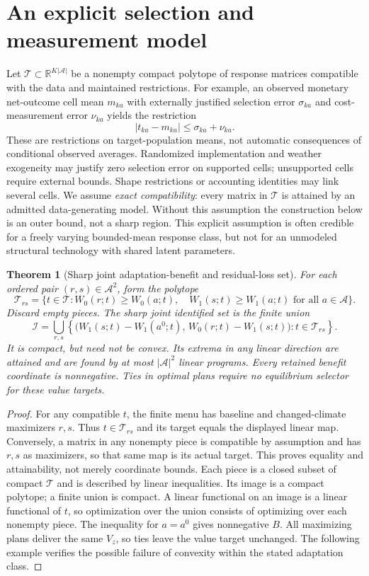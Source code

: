 \documentclass[11pt]{article}
\newtheorem{theorem}{Theorem}
\newcommand{\R}{\mathbb R}
\begin{document}
\section{An explicit selection and measurement model}
Let $\mathcal T\subset\R^{K|\mathcal A|}$ be a nonempty compact polytope
of response matrices compatible with the data and maintained restrictions.
For example, an observed monetary net-outcome cell mean $m_{ka}$ with
externally justified selection error $\sigma_{ka}$ and cost-measurement
error $\nu_{ka}$ yields the restriction
\[
 |t_{ka}-m_{ka}|\leq\sigma_{ka}+\nu_{ka}.             \tag{1}
\]
These are restrictions on target-population means, not automatic
consequences of conditional observed averages. Randomized implementation
and weather exogeneity may justify zero selection error on supported
cells; unsupported cells require external bounds. Shape restrictions or
accounting identities may link several cells. We assume \emph{exact
compatibility}: every matrix in $\mathcal T$ is attained by an admitted
data-generating model. Without this assumption the construction below is
an outer bound, not a sharp region. This explicit assumption is often
credible for a freely varying bounded-mean response class, but not for an
unmodeled structural technology with shared latent parameters.

\begin{theorem}[Sharp joint adaptation-benefit and residual-loss set]
For each ordered pair $(r,s)\in\mathcal A^2$, form the polytope
\[
 \mathcal T_{rs}=\{t\in\mathcal T:
 W_0(r;t)\geq W_0(a;t),\quad W_1(s;t)\geq W_1(a;t)
                        \text{ for all }a\in\mathcal A\}.
\]
Discard empty pieces. The sharp joint identified set is the finite union
\[
 \mathcal I=\bigcup_{r,s}
 \left\{\big(W_1(s;t)-W_1(a^0;t),\,
              W_0(r;t)-W_1(s;t)\big):t\in\mathcal T_{rs}\right\}.       \tag{2}
\]
It is compact, but need not be convex. Its extrema in any linear direction
are attained and are found by at most $|\mathcal A|^2$ linear programs.
Every retained benefit coordinate is nonnegative. Ties in optimal plans
require no equilibrium selector for these value targets.
\end{theorem}
\begin{proof}
For any compatible $t$, the finite menu has baseline and changed-climate
maximizers $r,s$. Thus $t\in\mathcal T_{rs}$ and its target equals the
displayed linear map. Conversely, a matrix in any nonempty piece is
compatible by assumption and has $r,s$ as maximizers, so that same map is
its actual target. This proves equality and attainability, not merely
coordinate bounds. Each piece is a closed subset of compact $\mathcal T$
and is described by linear inequalities. Its image is a compact polytope;
a finite union is compact. A linear functional on an image is a linear
functional of $t$, so optimization over the union consists of optimizing
over each nonempty piece. The inequality for $a=a^0$ gives nonnegative
$B$. All maximizing plans deliver the same $V_z$, so ties leave the value
target unchanged. The following example verifies the possible failure
of convexity within the stated adaptation class.
\end{proof}
\end{document}
